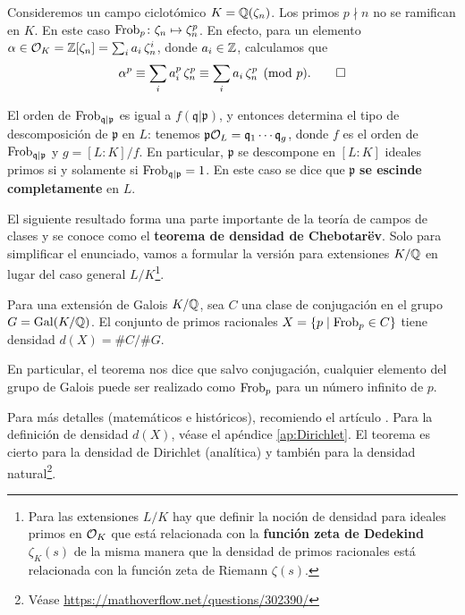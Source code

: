 \begin{ejemplo}
  Consideremos un campo ciclotómico $K = \mathbb{Q} (\zeta_n)$. Los primos $p \nmid n$
  no se ramifican en $K$. En este caso
  $\operatorname{Frob}_p\colon \zeta_n \mapsto \zeta_n^p$. En efecto, para un elemento
  $\alpha \in \mathcal{O}_K = \mathbb{Z} [\zeta_n] = \sum_i a_i \, \zeta_n^i$, donde
  $a_i \in \mathbb{Z}$, calculamos que
  \[ \alpha^p \equiv \sum_i a_i^p \, \zeta_n^p \equiv
     \sum_i a_i \, \zeta_n^p \pmod{p}. \qedhere \]
\end{ejemplo}

El orden de $\operatorname{Frob}_{\mathfrak{q}|\mathfrak{p}}$ es igual a
$f (\mathfrak{q}|\mathfrak{p})$, y entonces determina el tipo de
descomposición de $\mathfrak{p}$ en $L$: tenemos
$\mathfrak{p} \mathcal{O}_L = \mathfrak{q}_1\cdots \mathfrak{q}_g$, donde $f$
es el orden de $\operatorname{Frob}_{\mathfrak{q}|\mathfrak{p}}$ y $g = [L:K]/f$.
En particular, $\mathfrak{p}$ se descompone en $[L:K]$ ideales primos
si y solamente si $\operatorname{Frob}_{\mathfrak{q}|\mathfrak{p}} = 1$. En este caso se
dice que $\mathfrak{p}$ \textbf{se escinde completamente} en $L$.

\vspace{1em}

El siguiente resultado forma una parte importante de la teoría de campos de
clases y se conoce como el \textbf{teorema de densidad de Chebotarëv}.
Solo para simplificar el enunciado, vamos a formular la versión para extensiones
$K/\mathbb{Q}$ en lugar del caso general $L/K$\footnote{Para las extensiones $L/K$ hay
  que definir la noción de densidad para ideales primos en $\mathcal{O}_K$ que está
  relacionada con la \textbf{función zeta de Dedekind} $\zeta_K (s)$ de la misma
  manera que la densidad de primos racionales está relacionada con la función
  zeta de Riemann $\zeta (s)$.}.

\begin{teorema}
  Para una extensión de Galois $K/\mathbb{Q}$, sea $C$ una clase de conjugación en
  el grupo $G = \operatorname{Gal} (K/\mathbb{Q})$. El conjunto de primos racionales
  $X = \{ p \mid \operatorname{Frob}_p \in C \}$ tiene densidad $d (X) = \#C/\#G$.
\end{teorema}

En particular, el teorema nos dice que salvo conjugación, cualquier elemento del
grupo de Galois puede ser realizado como $\operatorname{Frob}_p$ para un número infinito de
$p$.

Para más detalles (matemáticos e históricos), recomiendo el artículo
\cite{Lenstra-Stevenhagen-1996}. Para la definición de densidad $d (X)$,
véase el apéndice \ref{ap:Dirichlet}. El teorema es cierto para la densidad de
Dirichlet (analítica) y también para la densidad natural\footnote{Véase
  \url{https://mathoverflow.net/questions/302390/}}.

